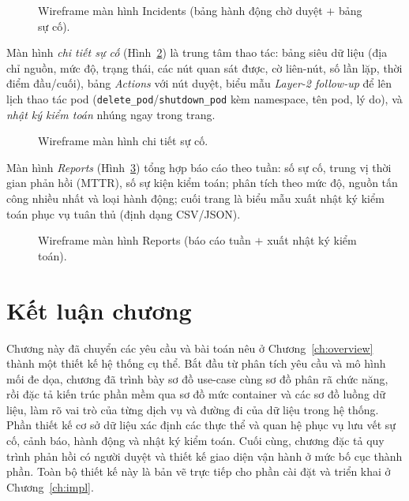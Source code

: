 \begin{figure}[H]
  \centering
  \resizebox{0.86\linewidth}{!}{}
  \caption{Wireframe màn hình Incidents (bảng hành động chờ duyệt $+$ bảng sự cố).}
  \label{fig:wf-incidents}
\end{figure}

Màn hình \textit{chi tiết sự cố} (Hình~\ref{fig:wf-detail}) là trung tâm thao tác: bảng
siêu dữ liệu (địa chỉ nguồn, mức độ, trạng thái, các nút quan sát được, cờ liên-nút, số
lần lặp, thời điểm đầu/cuối), bảng \emph{Actions} với nút duyệt, biểu mẫu \emph{Layer-2
follow-up} để lên lịch thao tác pod (\texttt{delete\_pod}/\texttt{shutdown\_pod} kèm
namespace, tên pod, lý do), và \emph{nhật ký kiểm toán} nhúng ngay trong trang.

\begin{figure}[H]
  \centering
  \resizebox{0.9\linewidth}{!}{}
  \caption{Wireframe màn hình chi tiết sự cố.}
  \label{fig:wf-detail}
\end{figure}

Màn hình \textit{Reports} (Hình~\ref{fig:wf-reports}) tổng hợp báo cáo theo tuần: số sự cố,
trung vị thời gian phản hồi (MTTR), số sự kiện kiểm toán; phân tích theo mức độ, nguồn tấn
công nhiều nhất và loại hành động; cuối trang là biểu mẫu xuất nhật ký kiểm toán phục vụ
tuân thủ (định dạng CSV/JSON).

\begin{figure}[H]
  \centering
  \resizebox{0.86\linewidth}{!}{}
  \caption{Wireframe màn hình Reports (báo cáo tuần $+$ xuất nhật ký kiểm toán).}
  \label{fig:wf-reports}
\end{figure}

\section{Kết luận chương}

Chương này đã chuyển các yêu cầu và bài toán nêu ở Chương~\ref{ch:overview} thành một
thiết kế hệ thống cụ thể. Bắt đầu từ phân tích yêu cầu và mô hình mối đe dọa, chương đã
trình bày sơ đồ use-case cùng sơ đồ phân rã chức năng, rồi đặc tả kiến trúc phần mềm qua
sơ đồ mức container và các sơ đồ luồng dữ liệu, làm rõ vai trò của từng dịch vụ và đường
đi của dữ liệu trong hệ thống. Phần thiết kế cơ sở dữ liệu xác định các thực thể và quan
hệ phục vụ lưu vết sự cố, cảnh báo, hành động và nhật ký kiểm toán. Cuối cùng, chương đặc
tả quy trình phản hồi có người duyệt và thiết kế giao diện vận hành ở mức bố cục thành
phần. Toàn bộ thiết kế này là bản vẽ trực tiếp cho phần cài đặt và triển khai ở
Chương~\ref{ch:impl}.
